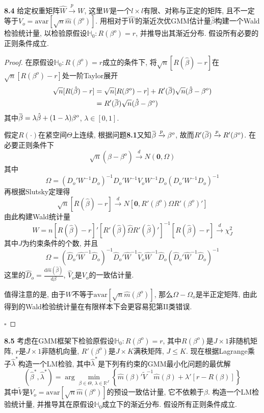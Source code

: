 \documentclass[cn,12pt,math=mtpro2,citestyle=gb7714-2015,bibstyle=gb7714-2015,twocol,mode=simple]{elegantbook}
\newcommand{\overbar}[1]{\mkern 1.5mu\overline{\mkern-1.5mu#1\mkern-1.5mu}\mkern 1.5mu}
\newcommand{\R}{\mathbb{R}}
\newcommand{\HH}{\mathbb{H}}
\newcommand{\hbeta}{\hat{\beta}}
\newcommand{\hatm}{\hat{m}}
\begin{document}
  \textbf{8.4} 给定权重矩阵$\hat{W}\xrightarrow{p}W$, 这里$W$是一个$l\times l$有限、对称与正定的矩阵, 且不一定等于$V_o=\text{avar}[\sqrt{n}\hat{m}(\beta^o)]$. 用相对于$\hat{W}$的渐近次优GMM估计量$\hbeta$构建一个Wald检验统计量, 以检验原假设$\HH_0: R(\beta^o)=r$, 并推导出其渐近分布. 假设所有必要的正则条件成立.

  \begin{proof}
    在原假设$\HH_0: R(\beta^o)=r$成立的条件下, 将$\sqrt{n}[R(\hbeta)-r]$在$\sqrt{n}[R(\beta^o)-r]$处一阶Taylor展开
    \begin{align*}
    \sqrt{n}[R(\hbeta)-r]&=\sqrt{n}[R(\beta^o)-r]+R'(\overbar{\beta})\sqrt{n}(\hbeta-\beta^o) \\
    &=R'(\overbar{\beta})\sqrt{n}(\hat{\beta}-\beta^o)
    \end{align*}
    其中$\overbar{\beta}=\lambda\hbeta+(1-\lambda)\beta^o$, $\lambda\in[0,1]$.

    假定$R(\cdot)$在紧空间$\Theta$上连续, 根据问题\textbf{8.1}又知$\overbar{\beta}\xrightarrow{p}\beta^o$, 故而$R'(\overbar{\beta})\xrightarrow{p}R'(\beta^o)$. 在必要正则条件下
    $$\sqrt{n}(\hbeta-\beta^o)\xrightarrow{d}N(\mathbf{0},\Omega)$$
    其中
    $$\Omega=(D_o'W^{-1}D_o)^{-1}D_o'W^{-1}V_oW^{-1}D_o(D_o'W^{-1}D_o)^{-1}$$
    再根据Slutsky定理得
    $$\sqrt{n}[R(\hbeta)-r]\xrightarrow{d}N[\mathbf{0},R'(\beta^o)\Omega R'(\beta^o)']$$
    由此构建Wald统计量
    $$W=n[R(\hbeta)-r]'[R'(\hbeta)\hat{\Omega}R'(\hbeta)']^{-1}[R(\hbeta)-r]\xrightarrow{d}\chi_J^2$$
    其中$J$为约束条件的个数, 并且
    $$\hat{\Omega}=(\hat{D}_o'\hat{W}^{-1}\hat{D}_o)^{-1}\hat{D}_o'\hat{W}^{-1}\hat{V}_o\hat{W}^{-1}\hat{D}_o(\hat{D}_o'\hat{W}^{-1}\hat{D}_o)^{-1}$$
    这里的$\displaystyle\hat{D}_o=\frac{\text{d}\hatm(\hbeta)}{\text{d}\beta}$, $\hat{V}_o$是$V_o$的一致估计量.

    值得注意的是, 由于$W$不等于$\text{avar}[\sqrt{n}\hatm(\beta^o)]$, 那么$\Omega-\Omega_o$是半正定矩阵, 由此得到的Wald检验统计量在有限样本下会更容易犯第II类错误.

    $\square$

  \end{proof}
  \textbf{8.5} 考虑在GMM框架下检验原假设$\HH_0:R(\beta^o)=r$, 其中$R(\beta^o)$是$J\times1$非随机矩阵, $r$是$J\times1$非随机向量, $R'(\beta^o)$是$J\times K$满秩矩阵, $J\leq K$. 现在根据Lagrange乘子$\hat{\lambda}^\ast$构造一个LM检验, 其中$\hat{\lambda}^\ast$是下列有约束的GMM最小化问题的最优解
  $$(\hat{\beta}^\ast,\hat{\lambda}^\ast)=\arg\min_{\beta\in\Theta,\,\lambda\in\R^J}\left\{\hatm(\beta)'\tilde{V}^{-1}\hatm(\beta)+\lambda'[r-R(\beta)]\right\}$$
  其中$\tilde{V}$是$V_o=\text{avar}[\sqrt{n}\hat{m}(\beta^o)]$的预设一致估计量, 它不依赖于$\beta$. 构造一个LM检验统计量, 并推导其在原假设$\HH_0$成立下的渐近分布. 假设所有正则条件成立.
\end{document}
